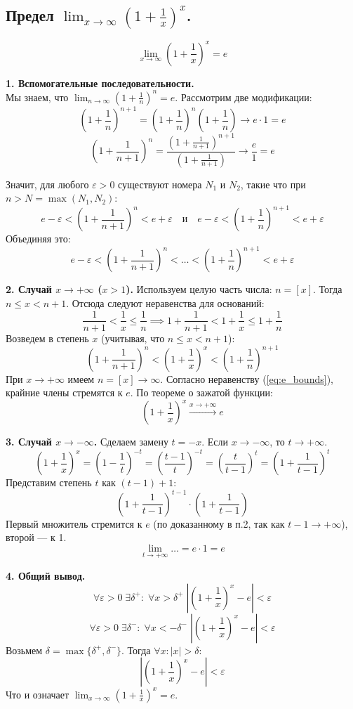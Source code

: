\subsection{Предел $\lim_{x\to\infty} (1 + \frac{1}{x})^x$.}
\[ \lim_{x\to\infty} \left(1 + \frac{1}{x}\right)^x = e \]

\begin{tcolorbox}[title=Доказательство, breakable]
	\textbf{1. Вспомогательные последовательности.}\\
	Мы знаем, что $\lim_{n\to\infty} (1+\frac{1}{n})^n = e$. Рассмотрим две модификации:
	\[ \left(1 + \frac{1}{n}\right)^{n+1} = \left(1 + \frac{1}{n}\right)^{n}\left(1 + \frac{1}{n}\right) \to e \cdot 1 = e \]
	\[ \left(1 + \frac{1}{n + 1}\right)^{n} = \frac{\left(1 + \frac{1}{n+1}\right)^{n+1}}{\left(1 + \frac{1}{n+1}\right)} \to \frac{e}{1} = e \]
	
	Значит, для любого $\varepsilon > 0$ существуют номера $N_1$ и $N_2$, такие что при $n > N = \max(N_1, N_2)$:
	\[ e - \varepsilon < \left(1 + \frac{1}{n+1}\right)^{n} < e + \varepsilon \quad \text{и} \quad e - \varepsilon < \left(1 + \frac{1}{n}\right)^{n+1} < e + \varepsilon \]
	Объединяя это:
	\begin{equation}\label{eq:e_bounds}
		e - \varepsilon < \left(1 + \frac{1}{n+1}\right)^{n} < \dots < \left(1 + \frac{1}{n}\right)^{n+1} < e + \varepsilon
	\end{equation}

	\textbf{2. Случай $x \to +\infty$ ($x > 1$).}
	Используем целую часть числа: $n = [x]$. Тогда $n \le x < n+1$.
	Отсюда следуют неравенства для оснований:
	\[ \frac{1}{n+1} < \frac{1}{x} \le \frac{1}{n} \implies 1 + \frac{1}{n+1} < 1 + \frac{1}{x} \le 1 + \frac{1}{n} \]
	Возведем в степень $x$ (учитывая, что $n \le x < n+1$):
	\[ \left(1 + \frac{1}{n + 1}\right)^{n} < \left(1 + \frac{1}{x}\right)^{x} < \left(1 + \frac{1}{n}\right)^{n+1} \]
	При $x \to +\infty$ имеем $n = [x] \to \infty$. Согласно неравенству (\ref{eq:e_bounds}), крайние члены стремятся к $e$.
	По теореме о зажатой функции:
	\[ \left(1 + \frac{1}{x}\right)^{x} \xrightarrow[]{x\to+\infty} e \]

	\textbf{3. Случай $x \to -\infty$.}
	Сделаем замену $t = -x$. Если $x \to -\infty$, то $t \to +\infty$.
	\[ \left(1 + \frac{1}{x}\right)^{x} = \left(1 - \frac{1}{t}\right)^{-t} = \left(\frac{t-1}{t}\right)^{-t} = \left(\frac{t}{t - 1}\right)^t = \left(1 + \frac{1}{t-1}\right)^{t} \]
	Представим степень $t$ как $(t-1) + 1$:
	\[ \left(1 + \frac{1}{t-1}\right)^{t-1} \cdot \left(1 + \frac{1}{t-1}\right) \]
	Первый множитель стремится к $e$ (по доказанному в п.2, так как $t-1 \to +\infty$), второй — к 1.
	\[ \lim_{t\to +\infty} \dots = e \cdot 1 = e \]

	\textbf{4. Общий вывод.}
	\[ \forall \varepsilon > 0\; \exists \delta^+: \;\forall x > \delta^+\; \left|\left(1 + \frac{1}{x}\right)^{x} - e\right| < \varepsilon \]
	\[ \forall \varepsilon > 0\; \exists \delta^-: \;\forall x < -\delta^-\; \left|\left(1 + \frac{1}{x}\right)^{x} - e\right| < \varepsilon \]
	Возьмем $\delta = \max\{ \delta^+, \delta^- \}$. Тогда $\forall x: |x| > \delta$:
	\[ \left|\left(1 + \frac{1}{x}\right)^{x} - e\right| < \varepsilon \]
	Что и означает $\lim_{x\to\infty} \left(1 + \frac{1}{x}\right)^x = e$.
\end{tcolorbox}

